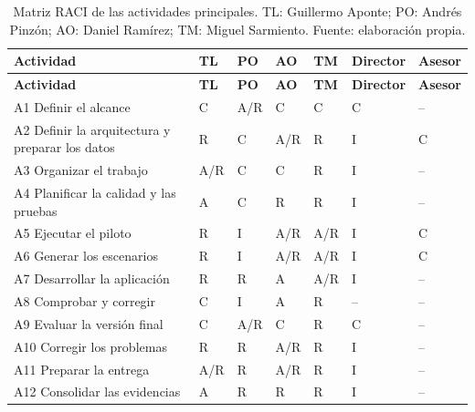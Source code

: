 \begin{longtable}{|p{}|p{}|p{}|p{}|p{}|p{}|p{}|}
\caption{Matriz RACI de las actividades principales. TL: Guillermo Aponte; PO: Andrés Pinzón; AO: Daniel Ramírez; TM: Miguel Sarmiento. Fuente: elaboración propia.}\label{tab:raci}\\
\hline
\textbf{Actividad} & \centering\textbf{TL} & \centering\textbf{PO} & \centering\textbf{AO} & \centering\textbf{TM} & \centering\textbf{Director} & \centering\textbf{Asesor}\tabularnewline\hline
\endfirsthead
\hline
\textbf{Actividad} & \centering\textbf{TL} & \centering\textbf{PO} & \centering\textbf{AO} & \centering\textbf{TM} & \centering\textbf{Director} & \centering\textbf{Asesor}\tabularnewline\hline
\endhead
A1 Definir el alcance & \centering C & \centering A/R & \centering C & \centering C & \centering C & \centering --\tabularnewline\hline
A2 Definir la arquitectura y preparar los datos & \centering R & \centering C & \centering A/R & \centering R & \centering I & \centering C\tabularnewline\hline
A3 Organizar el trabajo & \centering A/R & \centering C & \centering C & \centering R & \centering I & \centering --\tabularnewline\hline
A4 Planificar la calidad y las pruebas & \centering A & \centering C & \centering R & \centering R & \centering I & \centering --\tabularnewline\hline
A5 Ejecutar el piloto & \centering R & \centering I & \centering A/R & \centering A/R & \centering I & \centering C\tabularnewline\hline
A6 Generar los escenarios & \centering R & \centering I & \centering A/R & \centering A/R & \centering I & \centering C\tabularnewline\hline
A7 Desarrollar la aplicación & \centering R & \centering R & \centering A & \centering A/R & \centering I & \centering --\tabularnewline\hline
A8 Comprobar y corregir & \centering C & \centering I & \centering A & \centering R & \centering -- & \centering --\tabularnewline\hline
A9 Evaluar la versión final & \centering C & \centering A/R & \centering C & \centering R & \centering C & \centering --\tabularnewline\hline
A10 Corregir los problemas & \centering R & \centering R & \centering A/R & \centering R & \centering I & \centering --\tabularnewline\hline
A11 Preparar la entrega & \centering A/R & \centering R & \centering A/R & \centering R & \centering I & \centering --\tabularnewline\hline
A12 Consolidar las evidencias & \centering A & \centering R & \centering R & \centering R & \centering I & \centering --\tabularnewline\hline
\end{longtable}

